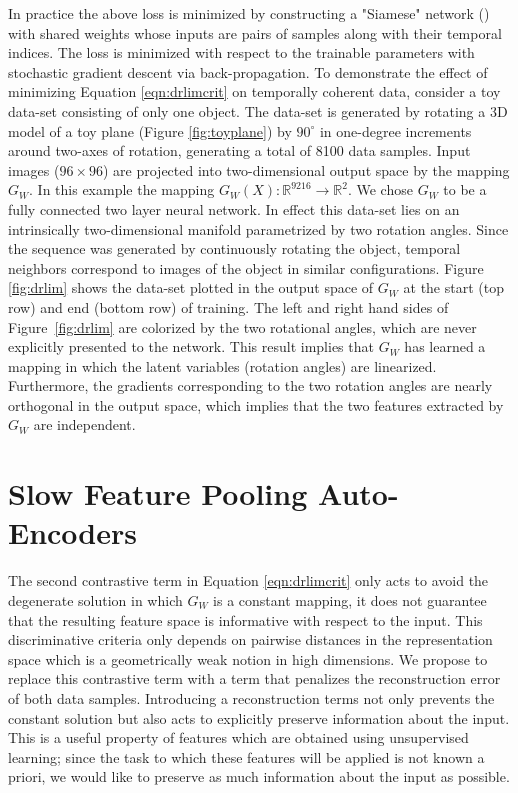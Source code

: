 \documentclass{article} %
\begin{document}
In practice the above loss is minimized by constructing a "Siamese" network (\cite{siamese}) with shared weights whose inputs are pairs of samples along with their temporal indices. The loss is minimized with respect to the trainable parameters with stochastic gradient descent via back-propagation. To demonstrate the effect of minimizing Equation \ref{eqn:drlimcrit} on temporally coherent data, consider a toy data-set consisting of only one object. The data-set is generated by rotating a 3D model of a toy plane (Figure \ref{fig:toyplane}) by $90^{\circ}$ in one-degree increments around two-axes of rotation, generating a total of 8100 data samples. Input images ($96 \times 96$) are projected into two-dimensional output space by the mapping $G_W$. In this example the mapping $G_W(X): \mathbb{R}^{9216} \to \mathbb{R}^2 $. We chose $G_W$ to be a fully connected two layer neural network. In effect this data-set lies on an intrinsically two-dimensional manifold parametrized by two rotation angles. Since the sequence was generated by continuously rotating the object, temporal neighbors correspond to images of the object in similar configurations. 
Figure \ref{fig:drlim} shows the data-set plotted in the output space of $G_W$ at the start (top row) and end (bottom row) of training. The left and right hand sides of Figure~\ref{fig:drlim} are colorized by the two rotational angles, which are never explicitly presented to the network. This result implies that $G_W$ has learned a mapping in which the latent variables (rotation angles) are linearized. Furthermore, the gradients corresponding to the two rotation angles are nearly orthogonal in the output space, which implies that the two features extracted by $G_W$ are independent.  

\section{Slow Feature Pooling Auto-Encoders}
\label{sfautoencs}
The second contrastive term in Equation \ref{eqn:drlimcrit} only acts to avoid the degenerate solution in which $G_W$ is a constant mapping, it does not guarantee that the resulting feature space is informative with respect to the input. 
This discriminative criteria only depends on pairwise distances in the representation space which is a geometrically weak notion in high
dimensions. We propose to replace this contrastive term with a term that penalizes the reconstruction error of both data samples. 
Introducing a reconstruction terms not only prevents the constant solution but also acts to explicitly preserve information about the input. 
This is a useful property of features which are obtained using unsupervised learning; since the task to which these features will be applied 
is not known a priori, we would like to preserve as much information about the input as possible. 
\end{document}
